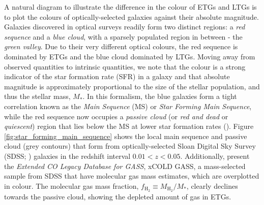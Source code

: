 A natural diagram to illustrate the difference in the colour of ETGs and LTGs is to plot the colours of optically-selected galaxies against their absolute magnitude. Galaxies discovered in optical surveys readily form two distinct regions: a \textit{red sequence} and a \textit{blue cloud}, with a sparsely populated region in between - the \textit{green valley}. Due to their very different optical colours, the red sequence is dominated by ETGs and the blue cloud dominated by LTGs. Moving away from observed quantities to intrinsic quantities, we note that the colour is a strong indicator of the star formation rate (SFR) in a galaxy and that absolute magnitude is approximately proportional to the size of the stellar population, and thus the stellar mass, $M_*$. In this formalism, the blue galaxies form a tight correlation known as the \textit{Main Sequence} (MS) or \textit{Star Forming Main Sequence}, while the red sequence now occupies a \textit{passive cloud} (or \textit{red and dead} or \textit{quiescent}) region that lies below the MS at lower star formation rates (\citealt{Noeske_2007, Daddi_2007, Elbaz_2007, Rodighiero_2011}). Figure \ref{fig:star_forming_main_sequence} shows the local main sequence and passive cloud (grey contours) that form from optically-selected Sloan Digital Sky Survey (SDSS; \citealt{York_2000}) galaxies in the redshift interval $0.01 < z < 0.05$. Additionally, \citealt{Saintonge_2017} present the \textit{Extended CO Legacy Database for GASS}, xCOLD GASS, a mass-selected sample from SDSS that have molecular gas mass estimates, which are overplotted in colour. The molecular gas mass fraction, $f_{\textrm{H}_2} \equiv M_{\textrm{H}_2}/M_*$, clearly declines towards the passive cloud, showing the depleted amount of gas in ETGs.


